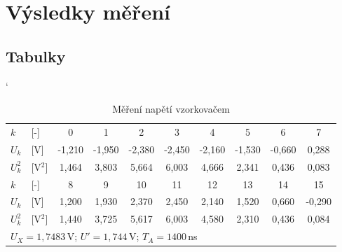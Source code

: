 \documentclass[a4paper, czech]{article}
\begin{document}
\section{Výsledky měření}

\subsection{Tabulky}

\begin{table}[H]
    \catcode`
    \centering
    \caption{Měření napětí vzorkovačem}
    \begin{tabular}{ll|cccccccc}
        \toprule
        $k$   & [-]  & 0      & 1      & 2      & 3      & 4      & 5      & 6      & 7     \\
        \cmidrule(rl){1-10}
        $U_k$  &  [V]  & -1,210 & -1,950 & -2,380 & -2,450 & -2,160 & -1,530 & -0,660 & 0,288 \\
        $U_k^2$ & [V$^2$] & 1,464  & 3,803  & 5,664  & 6,003  & 4,666  & 2,341  & 0,436  & 0,083 \\
        \midrule
        \midrule
        $k$   & [-]  &8     & 9     & 10    & 11    & 12    & 13    & 14    & 15     \\
        \cmidrule(rl){1-10}
        $U_k$  & [V]  &1,200 & 1,930 & 2,370 & 2,450 & 2,140 & 1,520 & 0,660 & -0,290 \\
        $U_k^2$ & [V$^2$] &1,440 & 3,725 & 5,617 & 6,003 & 4,580 & 2,310 & 0,436 & 0,084 \\
        \bottomrule
        \multicolumn{10}{l}{$U_X = 1,7483$\,V; $U' = 1,744$\,V; $T_A = 1400$\,ns}
    \end{tabular}
\end{table}
\end{document}
